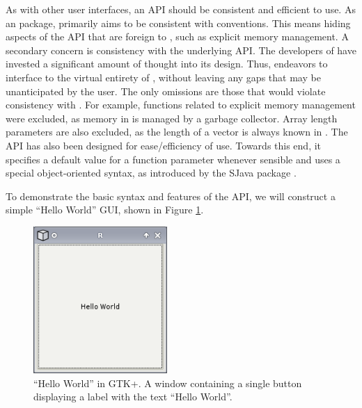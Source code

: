 \documentclass[article]{jss}
\begin{document}

As with other user interfaces,
an API should be consistent and efficient to use. As an 
package,
 primarily aims to be consistent with 
conventions. This
means hiding aspects of the  API that are foreign to
,
such as explicit memory management. A secondary concern is consistency 
with the underlying  API. The developers of
 have invested a significant amount of thought into its
design. Thus,
 endeavors to interface  to the virtual
entirety of ,
without leaving any gaps that may be unanticipated by the user. 
The only omissions are those that would violate consistency with
. For example, functions related to explicit memory
management were excluded, as memory in  is managed by a
garbage collector. Array length parameters are also excluded, as the
length of a vector is always known in .
The  API has also been designed for ease/efficiency of use.
Towards this end,
it specifies
a default value for a function parameter whenever sensible and uses a
special object-oriented syntax, as introduced by the SJava package
\citep{SJava}.

To demonstrate the basic syntax and
features of the  API, we will construct a simple ``Hello
World'' GUI,
shown in Figure \ref{fig:hello-world}. 

\begin{figure}
\begin{center}
\includegraphics[width=2in]{hello-world.png}
\caption{\label{fig:hello-world}``Hello World'' in GTK+. 
A window containing a single button displaying a label with the text
``Hello World''.}
\end{center}
\end{figure}
\end{document}
